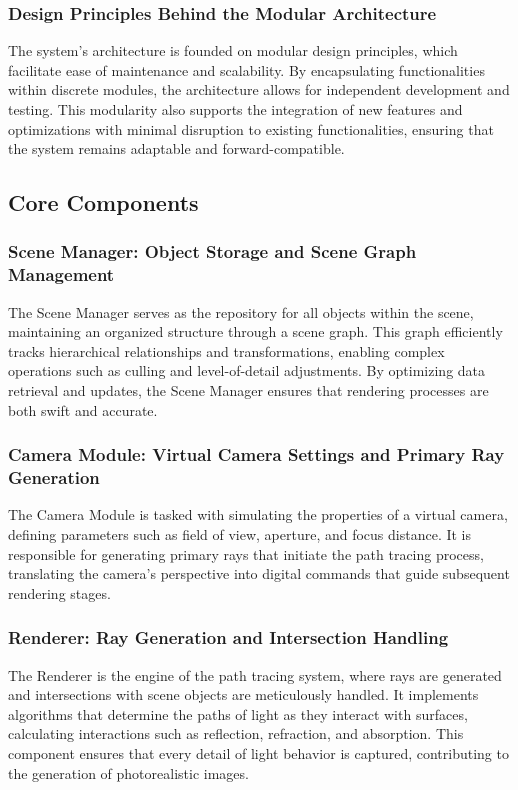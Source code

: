 \documentclass[12pt]{article}
\begin{document}
\subsubsection{Design Principles Behind the Modular Architecture}
The system's architecture is founded on modular design principles, which facilitate ease of maintenance and scalability. By encapsulating functionalities within discrete modules, the architecture allows for independent development and testing. This modularity also supports the integration of new features and optimizations with minimal disruption to existing functionalities, ensuring that the system remains adaptable and forward-compatible.

\subsection{Core Components}

\subsubsection{Scene Manager: Object Storage and Scene Graph Management}
The Scene Manager serves as the repository for all objects within the scene, maintaining an organized structure through a scene graph. This graph efficiently tracks hierarchical relationships and transformations, enabling complex operations such as culling and level-of-detail adjustments. By optimizing data retrieval and updates, the Scene Manager ensures that rendering processes are both swift and accurate.

\subsubsection{Camera Module: Virtual Camera Settings and Primary Ray Generation}
The Camera Module is tasked with simulating the properties of a virtual camera, defining parameters such as field of view, aperture, and focus distance. It is responsible for generating primary rays that initiate the path tracing process, translating the camera's perspective into digital commands that guide subsequent rendering stages.

\subsubsection{Renderer: Ray Generation and Intersection Handling}
The Renderer is the engine of the path tracing system, where rays are generated and intersections with scene objects are meticulously handled. It implements algorithms that determine the paths of light as they interact with surfaces, calculating interactions such as reflection, refraction, and absorption. This component ensures that every detail of light behavior is captured, contributing to the generation of photorealistic images.
\end{document}
